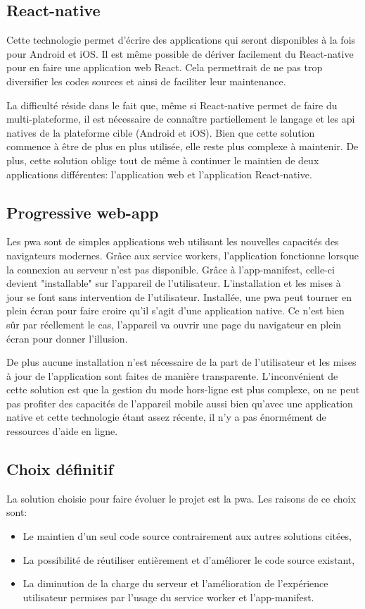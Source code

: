 \documentclass{EPL-master-thesis-covers-FR}
\begin{document}
			\subsection*{React-native}
				Cette technologie permet d'écrire des applications qui seront disponibles à la fois pour Android et iOS. Il est même possible de dériver facilement du React-native pour en faire une application web React. Cela permettrait de ne pas trop diversifier les codes sources et ainsi de faciliter leur maintenance.
				
				La difficulté réside dans le fait que, même si React-native permet de faire du multi-plateforme, il est nécessaire de connaître partiellement le langage et les \gls{api} natives de la plateforme cible (Android et iOS). Bien que cette solution commence à être de plus en plus utilisée, elle reste plus complexe à maintenir. De plus, cette solution oblige tout de même à continuer le maintien de deux applications différentes: l'application web et l'application React-native.
				
			\subsection*{Progressive web-app}
				Les \gls{pwa} sont de simples applications web utilisant les nouvelles capacités des navigateurs modernes. Grâce aux service workers, l'application fonctionne lorsque la connexion au serveur n'est pas disponible. Grâce à l'app-manifest, celle-ci devient "installable" sur l'appareil de l'utilisateur. L'installation et les mises à jour se font sans intervention de l'utilisateur. Installée, une \gls{pwa} peut tourner en plein écran pour faire croire qu'il s'agit d'une application native. Ce n'est bien sûr par réellement le cas, l'appareil va ouvrir une page du navigateur en plein écran pour donner l'illusion.
				
				De plus aucune installation n'est nécessaire de la part de l'utilisateur et les mises à jour de l'application sont faites de manière transparente. L'inconvénient de cette solution est que la gestion du mode hors-ligne est plus complexe, on ne peut pas profiter des capacités de l'appareil mobile aussi bien qu'avec une application native et cette technologie étant assez récente, il n'y a pas énormément de ressources d'aide en ligne.
				
			\subsection*{Choix définitif} 
				La solution choisie pour faire évoluer le projet est la \gls{pwa}. Les raisons de ce choix sont:
				\begin{itemize}
					\item Le maintien d'un seul code source contrairement aux autres solutions citées,
					\item La possibilité de réutiliser entièrement et d'améliorer le code source existant,
					\item La diminution de la charge du serveur et l'amélioration de l'expérience utilisateur permises par l'usage du service worker et l'app-manifest.
				\end{itemize}
				
\end{document}
